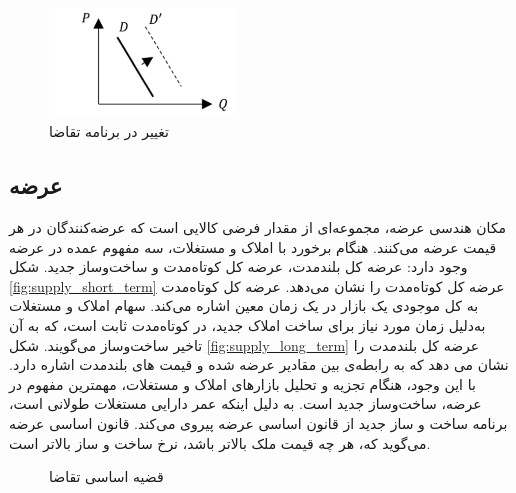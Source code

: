  \begin{figure}[H]
	\includegraphics[width=5cm]{../Figure/introduction/demand_shift.png}
	\centering
	\caption{تغییر در برنامه تقاضا}
	\label{fig:demand_shift}
\end{figure}

\subsection{عرضه}\label{sec:supply}

مکان هندسی عرضه، مجموعه‌ای از مقدار فرضی کالایی است که عرضه‌کنندگان در هر قیمت عرضه می‌کنند. هنگام برخورد با املاک و مستغلات، سه مفهوم عمده در عرضه وجود دارد: عرضه کل بلندمدت، عرضه کل کوتاه‌مدت و ساخت‌و‌ساز جدید. شکل
\ref{fig:supply_short_term}
  عرضه کل کوتاه‌مدت را نشان می‌دهد. عرضه کل کوتاه‌مدت به کل موجودی یک بازار در یک زمان معین اشاره می‌کند. سهام املاک و مستغلات به‌دلیل زمان مورد نیاز برای ساخت املاک جدید، در کوتاه‌مدت  ثابت است، که به آن تاخیر ساخت‌و‌ساز می‌گویند. شکل
  \ref{fig:supply_long_term}
   عرضه کل بلندمدت را نشان می دهد که به رابطه‌ی بین مقادیر عرضه شده و قیمت های بلندمدت اشاره دارد. با این وجود، هنگام تجزیه و تحلیل بازارهای املاک و مستغلات، مهمترین مفهوم در عرضه، ساخت‌و‌ساز جدید است. به دلیل اینکه عمر دارایی مستغلات طولانی است، برنامه ساخت و ساز جدید از قانون اساسی عرضه پیروی می‌کند. قانون اساسی عرضه  می‌گوید که، هر چه قیمت ملک بالاتر باشد، نرخ ساخت و ساز بالاتر است.

\begin{figure}[H]
	\centering
	\caption{قضیه اساسی تقاضا}
\end{figure}

